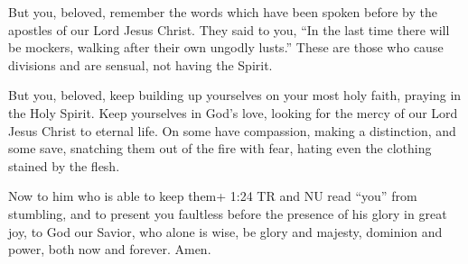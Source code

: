  But you, beloved, remember the words which have been
spoken before by the apostles of our Lord Jesus Christ. 
They said to you, ``In the last time there will be mockers, walking
after their own ungodly lusts.''  These are those who cause
divisions and are sensual, not having the Spirit.

 But you, beloved, keep building up yourselves on your most
holy faith, praying in the Holy Spirit.  Keep yourselves in
God's love, looking for the mercy of our Lord Jesus Christ to eternal
life.  On some have compassion, making a distinction,
 and some save, snatching them out of the fire with fear,
hating even the clothing stained by the flesh.

 Now to him who is able to keep them+ 1:24 TR and NU read
``you'' from stumbling, and to present you faultless before the presence
of his glory in great joy,  to God our Savior, who alone is
wise, be glory and majesty, dominion and power, both now and forever.
Amen.
